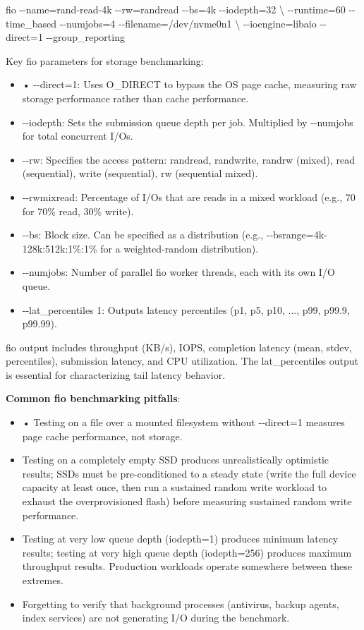 fio -\/-name=rand-read-4k -\/-rw=randread -\/-bs=4k -\/-iodepth=32 \textbackslash{} -\/-runtime=60 -\/-time\_based -\/-numjobs=4 -\/-filename=/dev/nvme0n1 \textbackslash{} -\/-ioengine=libaio -\/-direct=1 -\/-group\_reporting

Key fio parameters for storage benchmarking:

\begin{itemize}
  \item • -\/-direct=1: Uses O\_DIRECT to bypass the OS page cache, measuring raw storage performance rather than cache performance.
  \item -\/-iodepth: Sets the submission queue depth per job. Multiplied by -\/-numjobs for total concurrent I/Os.
  \item -\/-rw: Specifies the access pattern: randread, randwrite, randrw (mixed), read (sequential), write (sequential), rw (sequential mixed).
  \item -\/-rwmixread: Percentage of I/Os that are reads in a mixed workload (e.g., 70 for 70\% read, 30\% write).
  \item -\/-bs: Block size. Can be specified as a distribution (e.g., -\/-bsrange=4k-128k:512k:1\%:1\% for a weighted-random distribution).
  \item -\/-numjobs: Number of parallel fio worker threads, each with its own I/O queue.
  \item -\/-lat\_percentiles 1: Outputs latency percentiles (p1, p5, p10, ..., p99, p99.9, p99.99).
\end{itemize}

fio output includes throughput (KB/s), IOPS, completion latency (mean, stdev, percentiles), submission latency, and CPU utilization. The lat\_percentiles output is essential for characterizing tail latency behavior.

\textbf{Common fio benchmarking pitfalls}:

\begin{itemize}
  \item • Testing on a file over a mounted filesystem without -\/-direct=1 measures page cache performance, not storage.
  \item Testing on a completely empty SSD produces unrealistically optimistic results; SSDs must be pre-conditioned to a steady state (write the full device capacity at least once, then run a sustained random write workload to exhaust the overprovisioned flash) before measuring sustained random write performance.
  \item Testing at very low queue depth (iodepth=1) produces minimum latency results; testing at very high queue depth (iodepth=256) produces maximum throughput results. Production workloads operate somewhere between these extremes.
  \item Forgetting to verify that background processes (antivirus, backup agents, index services) are not generating I/O during the benchmark.
\end{itemize}

